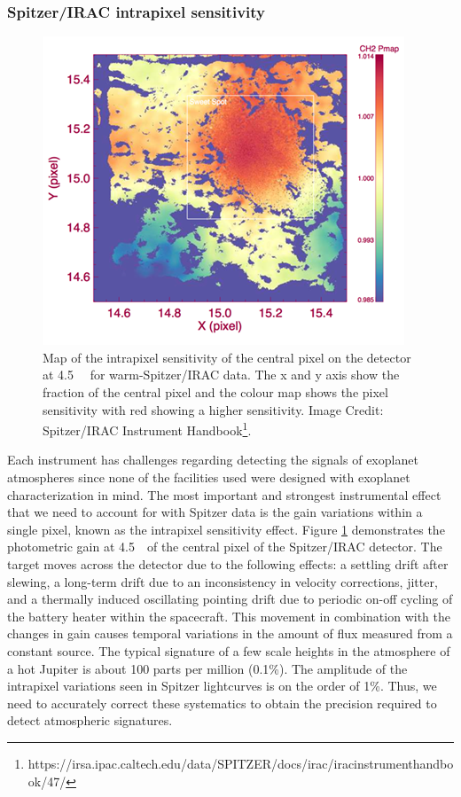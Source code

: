 \subsubsection{Spitzer/IRAC intrapixel sensitivity}

\begin{figure}
    \centering
    \includegraphics[width = \linewidth]{IRAC_Instrument_Handbook183.png}
    \caption{Map of the intrapixel sensitivity of the central pixel on the detector at 4.5~\um~ for warm-Spitzer/IRAC data. The x and y axis show the fraction of the central pixel and the colour map shows the pixel sensitivity with red showing a higher sensitivity. Image Credit: Spitzer/IRAC Instrument Handbook\footnote{https://irsa.ipac.caltech.edu/data/SPITZER/docs/irac/iracinstrumenthandbook/47/}.  }
    \label{int:fig:pmap}
\end{figure}

Each instrument has challenges regarding detecting the signals of exoplanet atmospheres since none of the facilities used were designed with exoplanet characterization in mind. The most important and strongest instrumental effect that we need to account for with Spitzer data is the gain variations within a single pixel, known as the intrapixel sensitivity effect. Figure \ref{int:fig:pmap} demonstrates the photometric gain at 4.5~\um~of the central pixel of the Spitzer/IRAC detector. The target moves across the detector due to the following effects: a settling drift after slewing, a long-term drift due to an inconsistency in velocity corrections, jitter, and a thermally induced oscillating pointing drift due to periodic on-off cycling of the battery heater within the spacecraft. This movement in combination with the changes in gain causes temporal variations in the amount of flux measured from a constant source. The typical signature of a few scale heights in the atmosphere of a hot Jupiter is about 100 parts per million (0.1\%). The amplitude of the intrapixel variations seen in Spitzer lightcurves is on the order of 1\%. Thus, we need to accurately correct these systematics to obtain the precision required to detect atmospheric signatures.

